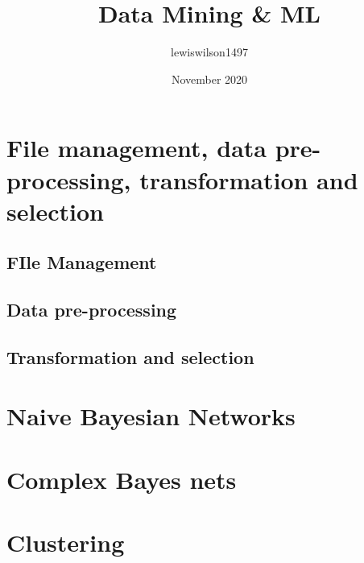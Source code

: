 \documentclass{article}
\title{Data Mining & ML}
\author{lewiswilson1497 }
\date{November 2020}
\begin{document}
\maketitle

\pagebreak

\tableofcontents
\thispagestyle{empty}
\pagebreak
\setcounter{page}{1}

\pagebreak


\section{File management, data pre-processing, transformation and selection}

\subsection{FIle Management}

\subsection{Data pre-processing}

\subsection{Transformation and selection}


\pagebreak

\section{Naive Bayesian Networks}

\pagebreak

\section{Complex Bayes nets}

\pagebreak

\section{Clustering}
\end{document}
